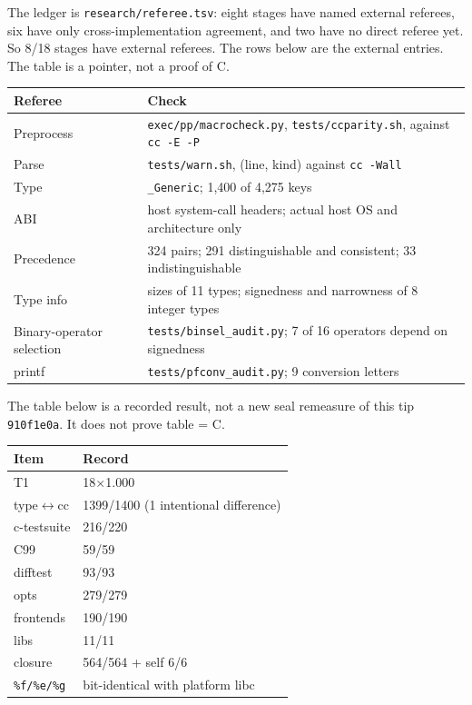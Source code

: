 \documentclass[11pt]{article}
\begin{document}
The ledger is \texttt{research/referee.tsv}: eight stages have named external referees, six have only cross-implementation agreement, and two have no direct referee yet. So 8/18 stages have external referees. The rows below are the external entries. The table is a pointer, not a proof of C.

\begin{center}
\footnotesize
\begin{tabular}{p{}p{}}
\toprule
Referee & Check \\
\midrule
Preprocess & \texttt{exec/pp/macrocheck.py}, \texttt{tests/ccparity.sh}, against \texttt{cc -E -P} \\
Parse & \texttt{tests/warn.sh}, (line, kind) against \texttt{cc -Wall} \\
Type & \texttt{\_Generic}; 1,400 of 4,275 keys \\
ABI & host system-call headers; actual host OS and architecture only \\
Precedence & 324 pairs; 291 distinguishable and consistent; 33 indistinguishable \\
Type info & sizes of 11 types; signedness and narrowness of 8 integer types \\
Binary-operator selection & \texttt{tests/binsel\_audit.py}; 7 of 16 operators depend on signedness \\
printf & \texttt{tests/pfconv\_audit.py}; 9 conversion letters \\
\bottomrule
\end{tabular}
\end{center}

The table below is a recorded result, not a new seal remeasure of this tip \texttt{910f1e0a}. It does not prove table = C.

\begin{center}
\begin{tabular}{ll}
\toprule
Item & Record \\
\midrule
T1 & 18$\times$1.000 \\
type$\leftrightarrow$cc & 1399/1400 (1 intentional difference) \\
c-testsuite & 216/220 \\
C99 & 59/59 \\
difftest & 93/93 \\
opts & 279/279 \\
frontends & 190/190 \\
libs & 11/11 \\
closure & 564/564 + self 6/6 \\
\texttt{\%f/\%e/\%g} & bit-identical with platform libc \\
\bottomrule
\end{tabular}
\end{center}
\end{document}
